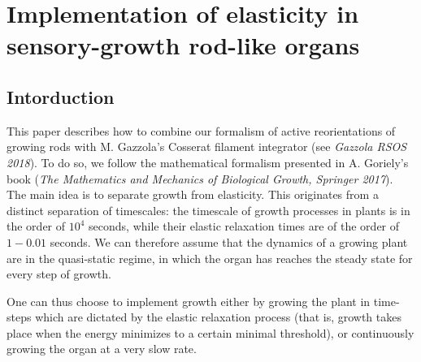\documentclass[a4paper, 11pt]{article}
\begin{document}
\section*{Implementation of elasticity in sensory-growth rod-like organs}
\subsection*{Intorduction}
This paper describes how to combine our formalism of active reorientations of growing rods with M. Gazzola's Cosserat filament integrator (see \emph{Gazzola RSOS 2018}). To do so, we follow the mathematical formalism presented in A. Goriely's book (\emph{The Mathematics and Mechanics of Biological Growth, Springer 2017}). The main idea is to separate growth from elasticity. This originates from a distinct separation of timescales: the timescale of growth processes in plants is in the order of $10^4$ seconds, while their elastic relaxation times are of the order of $1-0.01$ seconds. We can therefore assume that the dynamics of a growing plant are in the quasi-static regime, in which the organ has reaches the steady state for every step of growth. 


One can thus choose to implement growth either by growing the plant in time-steps which are dictated by the elastic relaxation process (that is, growth takes place when the energy minimizes to a certain minimal threshold), or continuously growing the organ at a very slow rate. 
\end{document}
